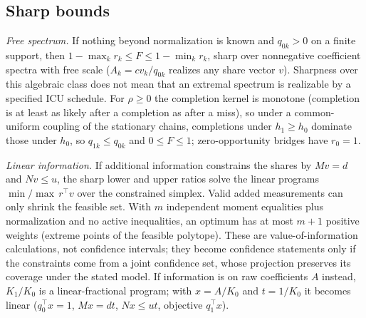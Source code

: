 \documentclass[11pt]{article}
\begin{document}
\subsection{Sharp bounds}\label{sec:s-proof-bounds}
\emph{Free spectrum.} If nothing beyond normalization is known and $q_{0k}>0$ on a
finite support, then $1-\max_kr_k\le F\le1-\min_kr_k$, sharp over nonnegative
coefficient spectra with free scale ($A_k=cv_k/q_{0k}$ realizes any share vector
$v$). Sharpness over this algebraic class does not mean that an extremal spectrum
is realizable by a specified ICU schedule. For $\rho\ge0$ the completion kernel
is monotone (completion is at least as likely after a completion as after a
miss), so under a common-uniform coupling of the stationary chains, completions
under $h_1\ge h_0$ dominate those under $h_0$, so
$q_{1k}\le q_{0k}$ and $0\le F\le1$; zero-opportunity bridges have $r_0=1$.

\emph{Linear information.} If additional information constrains the shares by
$Mv=d$ and $Nv\le u$, the sharp lower and upper ratios solve the linear programs
$\min/\max\, r^{\top}v$ over the constrained simplex. Valid added measurements
can only shrink the feasible set. With $m$ independent moment equalities plus
normalization and no active inequalities, an optimum has at most $m+1$ positive
weights (extreme points of the feasible polytope). These are value-of-information
calculations, not confidence intervals; they become confidence statements only
if the constraints come from a joint confidence set, whose projection preserves
its coverage under the stated model. If information is on raw coefficients $A$
instead, $K_1/K_0$ is a linear-fractional program; with $x=A/K_0$ and $t=1/K_0$ it
becomes linear ($q_0^{\top}x=1$, $Mx=dt$, $Nx\le ut$, objective $q_1^{\top}x$).
\end{document}
